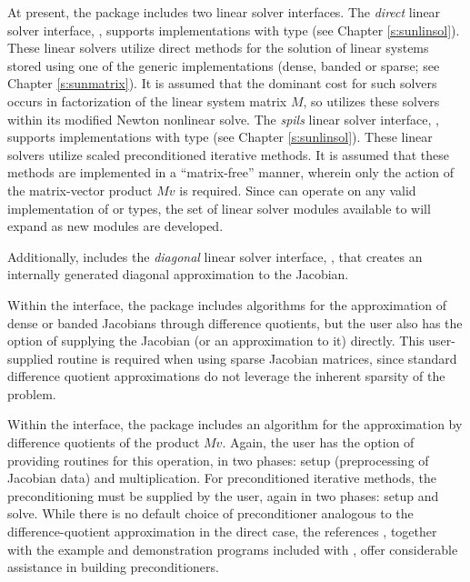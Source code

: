 At present, the package includes two linear solver interfaces.  The
{\em direct} linear solver interface, {\cvdls}, supports {\sunlinsol}
implementations with type  (see Chapter
\ref{s:sunlinsol}).  These linear solvers utilize direct methods for
the solution of linear systems stored using one of the {\sundials} generic
{\sunmatrix} implementations (dense, banded or sparse; see
Chapter \ref{s:sunmatrix}).  It is assumed that the dominant cost for
such solvers occurs in factorization of the linear system matrix $M$,
so {\cvode} utilizes these solvers within its modified Newton
nonlinear solve. 
The {\em spils} linear solver interface, {\cvspils}, supports
{\sunlinsol} implementations with type 
(see Chapter \ref{s:sunlinsol}).  These linear solvers utilize scaled
preconditioned iterative methods.  It is assumed that these methods
are implemented in a ``matrix-free'' manner, wherein only the action
of the matrix-vector product $Mv$ is required.  Since {\cvode} can
operate on any valid {\sunlinsol} implementation of
 or  types, the set of
linear solver modules available to {\cvode} will expand as new
{\sunlinsol} modules are developed.

Additionally, {\cvode} includes the {\em diagonal} linear solver
interface, {\cvdiag}, that creates an internally generated diagonal
approximation to the Jacobian.

Within the {\cvdls} interface, the package includes algorithms for the
approximation of dense or banded Jacobians through difference 
quotients, but the user also has the option of supplying the Jacobian
(or an approximation to it) directly.  This user-supplied 
routine is required when using sparse Jacobian matrices, since
standard difference quotient approximations do not leverage the
inherent sparsity of the problem.

Within the {\cvspils} interface, the package includes an algorithm for
the approximation by difference quotients of the product $Mv$. Again,
the user has the option of providing routines for this operation, in
two phases: setup (preprocessing of Jacobian data) and multiplication.
For preconditioned iterative methods,  
the preconditioning must be supplied by the user, again in two phases: 
setup and solve.  While there is no
default choice of preconditioner analogous to the difference-quotient
approximation in the direct case, the references
\cite{BrHi:89,Byr:92}, together with the example and demonstration
programs included with {\cvode}, offer considerable assistance in
building preconditioners. 


